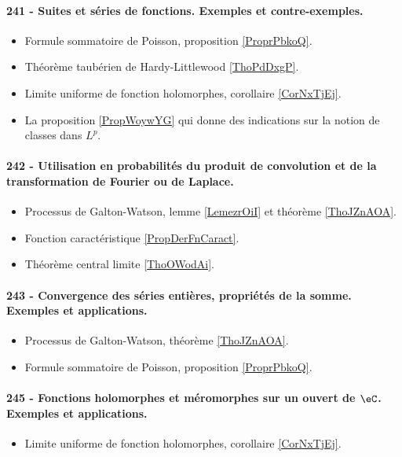 \paragraph{241 - Suites et séries de fonctions. Exemples et contre-exemples.}
\begin{itemize}
    \item Formule sommatoire de Poisson, proposition \ref{ProprPbkoQ}.
    \item Théorème taubérien de Hardy-Littlewood \ref{ThoPdDxgP}.
    \item Limite uniforme de fonction holomorphes, corollaire \ref{CorNxTjEj}.
    \item La proposition \ref{PropWoywYG} qui donne des indications sur la notion de classes dans \( L^p\).
\end{itemize}
\paragraph{242 - Utilisation en probabilités du produit de convolution et de la transformation de Fourier ou de Laplace.}
\begin{itemize}
    \item Processus de Galton-Watson, lemme \ref{LemezrOiI} et théorème \ref{ThoJZnAOA}.
    \item Fonction caractéristique \ref{PropDerFnCaract}.
    \item Théorème central limite \ref{ThoOWodAi}.
\end{itemize}

\paragraph{243 - Convergence des séries entières, propriétés de la somme. Exemples et applications.}
\begin{itemize}
    \item Processus de Galton-Watson, théorème \ref{ThoJZnAOA}.
    \item Formule sommatoire de Poisson, proposition \ref{ProprPbkoQ}.
\end{itemize}
\paragraph{245 - Fonctions holomorphes et méromorphes sur un ouvert de \( \eC\). Exemples et applications.}
\begin{itemize}
    \item Limite uniforme de fonction holomorphes, corollaire \ref{CorNxTjEj}.
\end{itemize}
